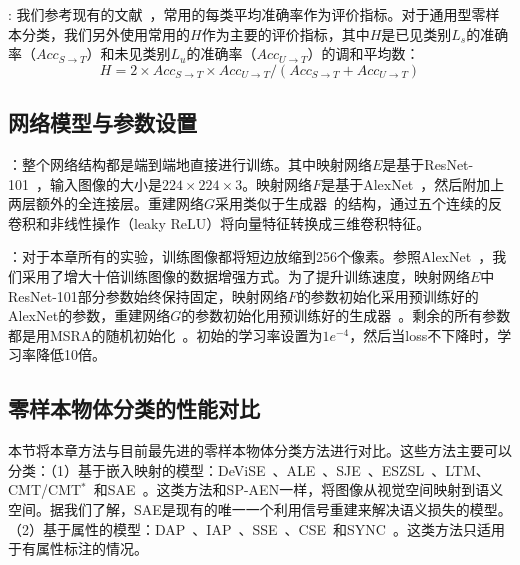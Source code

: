 :
我们参考现有的文献~\cite{xian2017zero}，常用的每类平均准确率作为评价指标。对于通用型零样本分类，我们另外使用常用的$H$作为主要的评价指标，其中$H$是已见类别$L_s$的准确率（$Acc_{S\rightarrow T}$）和未见类别$L_u$的准确率（$Acc_{U\rightarrow T}$）的调和平均数：
\begin{equation} \label{ch3:equ:H}
H = 2\times Acc_{S\rightarrow T}\times Acc_{U\rightarrow T} /(Acc_{S\rightarrow T}+Acc_{U\rightarrow T})
\end{equation}

\subsection{网络模型与参数设置}
：整个网络结构都是端到端地直接进行训练。其中映射网络$E$是基于ResNet-101~\cite{he2016deep}，输入图像的大小是$224\times224\times3$。映射网络$F$是基于AlexNet~\cite{krizhevsky2012imagenet}，然后附加上两层额外的全连接层。重建网络$G$采用类似于生成器~\cite{dosovitskiy2016generating}的结构，通过五个连续的反卷积和非线性操作（leaky ReLU）将向量特征转换成三维卷积特征。


：对于本章所有的实验，训练图像都将短边放缩到256个像素。参照AlexNet~\cite{krizhevsky2012imagenet}，我们采用了增大十倍训练图像的数据增强方式。为了提升训练速度，映射网络$E$中ResNet-101部分参数始终保持固定，映射网络$F$的参数初始化采用预训练好的AlexNet的参数，重建网络$G$的参数初始化用预训练好的生成器~\cite{dosovitskiy2016generating}。剩余的所有参数都是用MSRA的随机初始化~\cite{he2015delving}。初始的学习率设置为$1e^{-4}$，然后当loss不下降时，学习率降低10倍。


\subsection{零样本物体分类的性能对比}
本节将本章方法与目前最先进的零样本物体分类方法进行对比。这些方法主要可以分类：（1）基于嵌入映射的模型：DeViSE~\cite{frome2013devise}、ALE~\cite{akata2015label}、SJE~\cite{akata2015evaluation}、ESZSL~\cite{romera2015embarrassingly}、LTM\cite{xian2016latent}、CMT/CMT$^*$~\cite{socher2013zero}和SAE~\cite{kodirov2017semantic}。这类方法和SP-AEN一样，将图像从视觉空间映射到语义空间。据我们了解，SAE是现有的唯一一个利用信号重建来解决语义损失的模型。（2）基于属性的模型：DAP~\cite{lampert2009learning}、IAP~\cite{lampert2009learning}、SSE~\cite{zhang2015zero}、CSE~\cite{norouzi2014zero}和SYNC~\cite{changpinyo2016synthesized}。这类方法只适用于有属性标注的情况。

